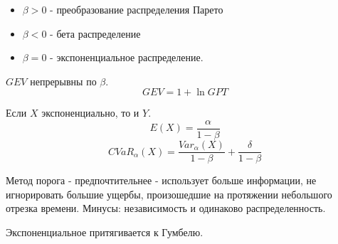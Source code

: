 \documentclass[%
12pt, %
final, %
oneside, %
onecolumn, %
centertags]{article} %
\theoremstyle{plain}
\theoremstyle{definition}
\theoremstyle{remark}
\begin{document}
\begin{itemize}
	\item $\beta > 0$ - преобразование распределения Парето
	\item $\beta < 0$ - бета распределение
	\item $\beta = 0$ - экспоненциальное распределение.
\end{itemize}

$GEV$ непрерывны по $\beta$.
$$GEV = 1 + \ln GPT$$

Если $X$ экспоненциально, то и $Y$.
$$E(X) = \frac{\alpha}{1 - \beta}$$
$$CVaR_{\alpha}(X) =\frac{Var_{\alpha}(X)}{1-\beta} + \frac{\delta}{1-\beta}$$

Метод порога - предпочтительнее - использует больше информации, не игнорировать большие ущербы, произошедшие на протяжении небольшого отрезка времени. Минусы: независимость и одинаково распределенность.

Экспоненциальное притягивается к Гумбелю.
\end{document}
